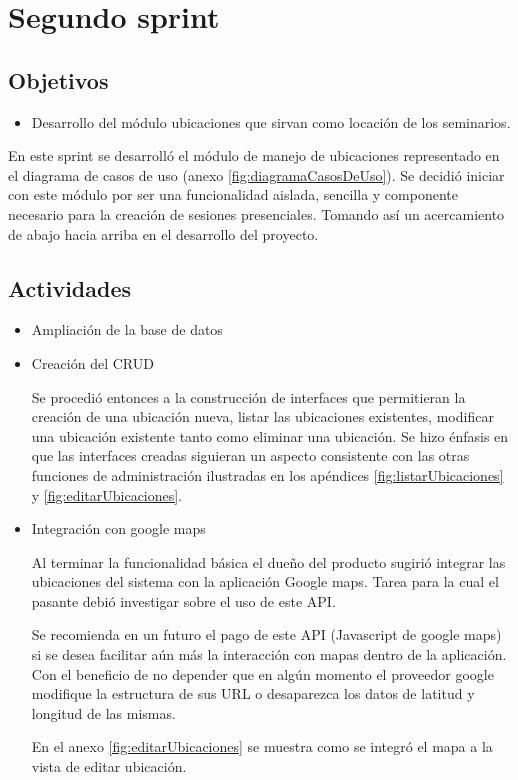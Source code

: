 \section{Segundo sprint} %
\label{sec:segundo_sprint}

\subsection{Objetivos}

\begin{itemize}
	\item Desarrollo del módulo ubicaciones que sirvan como locación de los seminarios.
\end{itemize}

En este sprint se desarrolló el módulo de manejo de ubicaciones representado en el diagrama de casos de uso (anexo \ref{fig:diagramaCasosDeUso}). Se decidió iniciar con este módulo por ser una funcionalidad aislada, sencilla y componente necesario para la creación de sesiones presenciales. Tomando así un acercamiento de abajo hacia arriba en el desarrollo del proyecto.

\subsection{Actividades} %
\label{sub:actividades2}

\begin{itemize}

\item Ampliación de la base de datos

\item Creación del \gls{CRUD}


Se procedió entonces a la construcción de interfaces que permitieran la creación de una ubicación nueva, listar las ubicaciones existentes, modificar una ubicación existente tanto como eliminar una ubicación. Se hizo énfasis en que las interfaces creadas siguieran un aspecto consistente con las otras funciones de administración ilustradas en los apéndices \ref{fig:listarUbicaciones} y \ref{fig:editarUbicaciones}.

\item Integración con google maps

Al terminar la funcionalidad básica el dueño del producto sugirió integrar las ubicaciones del sistema con la aplicación Google maps. Tarea para la cual el pasante debió investigar sobre el uso de este \gls{API}. 

Se recomienda en un futuro el pago de este \gls{API} (Javascript de google maps) si se desea facilitar aún más la interacción con mapas dentro de la aplicación. Con el beneficio de no depender que en algún momento el proveedor google modifique la estructura de sus \gls{URL} o desaparezca los datos de latitud y longitud de las mismas.

En el anexo \ref{fig:editarUbicaciones} se muestra como se integró el mapa a la vista de editar ubicación.

\end{itemize}





